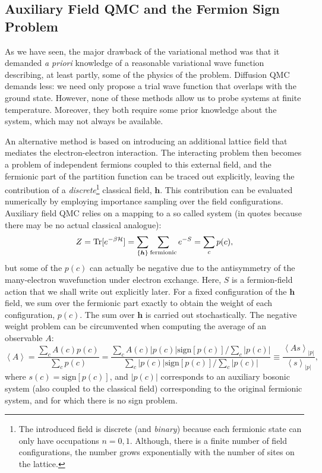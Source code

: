 \subsection{Auxiliary Field \acs{QMC} and the Fermion Sign Problem}
\label{subsec:introAFQMC}

As we have seen, the major drawback of the variational method was that it demanded \emph{a priori} knowledge of a reasonable variational wave function describing, at least partly, some of the physics of the problem.
Diffusion \acs{QMC} demands less: we need only propose a trial wave function that overlaps with the ground state.
However, none of these methods allow us to probe systems at finite temperature.
Moreover, they both require some prior knowledge about the system, which may not always be available.

An alternative method is based on introducing an additional lattice field that mediates the electron-electron interaction.
The interacting problem then becomes a problem of independent fermions coupled to this external field, and the fermionic part of the partition function can be traced out explicitly, leaving the contribution of a \emph{discrete}\footnote{The introduced field is discrete (and \emph{binary}) because each fermionic state can only have occupations $n = 0, 1$. Although, there is a finite number of field configurations, the number grows exponentially with the number of sites on the lattice.} classical field, $\bm h$.
This contribution can be evaluated numerically by employing importance sampling over the field configurations.
Auxiliary field \acs{QMC} relies on a mapping to a so called  system (in quotes because there may be no actual classical analogue):
\begin{equation}\label{eq:Zsign}
Z = \operatorname{Tr} [ e^{-\beta \mathcal{H} } ] = \sum_{\{ \bm h\} } \sum_{\text{fermionic}} e^{-S} = \sum_c p (c) ,
\end{equation}
but some of the  $p (c)$ can actually be negative due to the antisymmetry of the many-electron wavefunction under electron exchange.
Here, $S$ is a fermion-field action that we shall write out explicitly later.
For a fixed configuration of the $\bm h$ field, we sum over the fermionic part exactly to obtain the weight of each configuration, $p (c)$.
The sum over $\bm h$ is carried out stochastically.
The negative weight problem can be circumvented when computing the average of an observable $A$:
\begin{equation}\label{eq:signSampling}
\left\langle A \right\rangle = \frac{\sum_c A ( c ) p ( c )}{\sum_c p ( c ) } = \frac{\sum_c A ( c )|  p ( c ) | \text{sign}[p(c)] / \sum_c | p ( c ) | }{\sum_c  |  p ( c ) | \text{sign}[p(c)] /  \sum_c | p ( c ) |} \equiv \frac{\left\langle A s \right\rangle_{|p|}}{\left\langle s \right\rangle_{|p|}} ,
\end{equation}
where $s(c) = \text{sign} [ p ( c ) ]$, and $| p ( c ) | $ corresponds to an auxiliary bosonic system (also coupled to the classical field) corresponding to the original fermionic system, and for which there is no sign problem.

